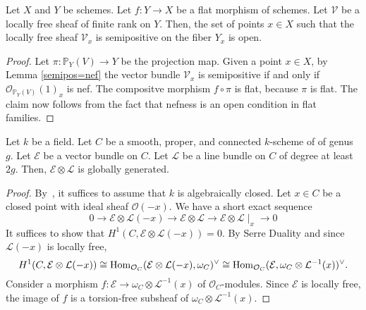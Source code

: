 \begin{lemma}\label{semipos_locus_open}
Let $X$ and $Y$ be schemes.
Let $f:Y\to X$ be a flat morphism of schemes.
Let $\mathcal{V}$ be a locally free sheaf of finite rank on $Y$.
Then, the set of points $x\in X$ such that the locally free sheaf
$\mathcal{V}_x$ is semipositive on the fiber $Y_x$ is open.
\end{lemma}

\begin{proof}
Let $\pi:\mathbb{P}_Y(V)\to Y$ be the projection map.
Given a point $x\in X$, by Lemma \ref{semipos=nef} the vector bundle
$\mathcal{V}_x$ is semipositive if and only if
$\mathcal{O}_{\mathbb{P}_Y(V)}(1)_x$ is nef.
The compositve morphism $f\circ \pi$ is flat, because $\pi$ is flat.
The claim now follows from the fact that nefness is an open condition in flat
families.
\end{proof}

\begin{lemma}\label{global_generation_of_twist_on_curve}
Let $k$ be a field.
Let $C$ be a smooth, proper, and connected $k$-scheme of of genus $g$.
Let $\mathcal{E}$ be a vector bundle on $C$.
Let $\mathcal{L}$ be a line bundle on $C$ of degree at least $2g$.
Then, $\mathcal{E}\otimes\mathcal{L}$ is globally generated.
\end{lemma}

\begin{proof}
By~, it suffices to assume that $k$ is algebraically closed.
Let $x\in C$ be a closed point with ideal sheaf $\mathcal{O}(-x)$.
We have a short exact sequence
\begin{equation}
  0 \to
  \mathcal{E} \otimes \mathcal{L}(-x) \to
  \mathcal{E} \otimes \mathcal{L} \to
  \mathcal{E} \otimes \mathcal{L}\mid_x \to
  0
\end{equation}
It suffices to show that $H^1(C,\mathcal{E}\otimes\mathcal{L}(-x)) = 0$.
By Serre Duality and
since $\mathcal{L}(-x)$ is locally free,
$$
H^1(C,\mathcal{E}\otimes\mathcal{L}(-x)) \cong
  \mathop{\rm Hom}\nolimits_{\mathcal{O}_C}(\mathcal{E} \otimes \mathcal{L}(-x),\omega_C)^\vee \cong
  \mathop{\rm Hom}\nolimits_{\mathcal{O}_C}(\mathcal{E},\omega_C\otimes\mathcal{L}^{-1}(x))^\vee.
$$
Consider a morphism $f : \mathcal{E} \to \omega_C \otimes \mathcal{L}^{-1}(x)$
of $\mathcal{O}_C$-modules.
Since $\mathcal{E}$ is locally free, the image of $f$ is a torsion-free
subsheaf of $\omega_C \otimes \mathcal{L}^{-1}(x)$.
\end{proof}



